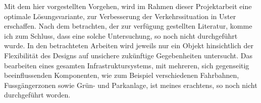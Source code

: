Mit dem hier vorgestellten Vorgehen, wird im Rahmen dieser Projektarbeit eine optimale Lösungsvariante, zur Verbesserung der Verkehrssituation in Uster erschaffen. Nach dem betrachten, der zur verfügung gestellten Literatur, komme ich zum Schluss, dass eine solche Untersuchung, so noch nicht durchgeführt wurde. In den betrachteten Arbeiten wird jeweils nur ein Objekt hinsichtlich der Flexibilität des Designs auf unsichere zukünftige Gegebenheiten untersucht. Das bearbeiten eines gesamten Infrastruktursystems, mit mehreren, sich gegenseitig beeinflussenden Komponenten, wie zum Beispiel verschiedenen Fahrbahnen, Fussgängerzonen sowie Grün- und Parkanlage, ist meines erachtens, so noch nicht durchgeführt worden.

%

